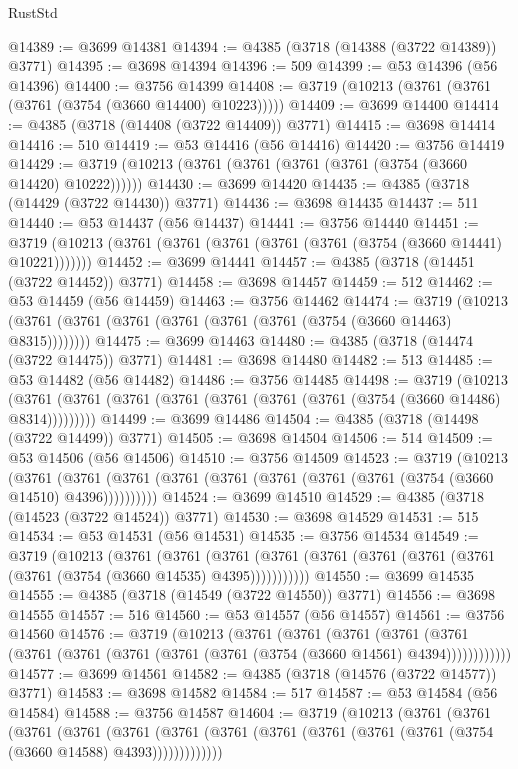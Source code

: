 \begin{lexlean}{RustStd}
\begin{coremodule}
{\begin{coremodule}
{{{{{{{{{{{{{{{{{{{{{{{{{{{{{{{{{{{{{{{{{{{{{{{@14389 := @3699 @14381
@14394 := @4385 (@3718 (@14388 (@3722 @14389)) @3771)
@14395 := @3698 @14394
@14396 := 509
@14399 := @53 @14396 (@56 @14396)
@14400 := @3756 @14399
@14408 := @3719 (@10213 (@3761 (@3761 (@3761 (@3754 (@3660 @14400) @10223)))))
@14409 := @3699 @14400
@14414 := @4385 (@3718 (@14408 (@3722 @14409)) @3771)
@14415 := @3698 @14414
@14416 := 510
@14419 := @53 @14416 (@56 @14416)
@14420 := @3756 @14419
@14429 := @3719 (@10213 (@3761 (@3761 (@3761 (@3761 (@3754 (@3660 @14420) @10222))))))
@14430 := @3699 @14420
@14435 := @4385 (@3718 (@14429 (@3722 @14430)) @3771)
@14436 := @3698 @14435
@14437 := 511
@14440 := @53 @14437 (@56 @14437)
@14441 := @3756 @14440
@14451 := @3719 (@10213 (@3761 (@3761 (@3761 (@3761 (@3761 (@3754 (@3660 @14441) @10221)))))))
@14452 := @3699 @14441
@14457 := @4385 (@3718 (@14451 (@3722 @14452)) @3771)
@14458 := @3698 @14457
@14459 := 512
@14462 := @53 @14459 (@56 @14459)
@14463 := @3756 @14462
@14474 := @3719
    (@10213 (@3761 (@3761 (@3761 (@3761 (@3761 (@3761 (@3754 (@3660 @14463) @8315))))))))
@14475 := @3699 @14463
@14480 := @4385 (@3718 (@14474 (@3722 @14475)) @3771)
@14481 := @3698 @14480
@14482 := 513
@14485 := @53 @14482 (@56 @14482)
@14486 := @3756 @14485
@14498 := @3719
    (@10213 (@3761 (@3761 (@3761 (@3761 (@3761 (@3761 (@3761 (@3754 (@3660 @14486) @8314)))))))))
@14499 := @3699 @14486
@14504 := @4385 (@3718 (@14498 (@3722 @14499)) @3771)
@14505 := @3698 @14504
@14506 := 514
@14509 := @53 @14506 (@56 @14506)
@14510 := @3756 @14509
@14523 := @3719
    (@10213
      (@3761 (@3761 (@3761 (@3761 (@3761 (@3761 (@3761 (@3761 (@3754 (@3660 @14510) @4396))))))))))
@14524 := @3699 @14510
@14529 := @4385 (@3718 (@14523 (@3722 @14524)) @3771)
@14530 := @3698 @14529
@14531 := 515
@14534 := @53 @14531 (@56 @14531)
@14535 := @3756 @14534
@14549 := @3719
    (@10213
      (@3761
        (@3761
          (@3761 (@3761 (@3761 (@3761 (@3761 (@3761 (@3761 (@3754 (@3660 @14535) @4395)))))))))))
@14550 := @3699 @14535
@14555 := @4385 (@3718 (@14549 (@3722 @14550)) @3771)
@14556 := @3698 @14555
@14557 := 516
@14560 := @53 @14557 (@56 @14557)
@14561 := @3756 @14560
@14576 := @3719
    (@10213
      (@3761
        (@3761
          (@3761
            (@3761 (@3761 (@3761 (@3761 (@3761 (@3761 (@3761 (@3754 (@3660 @14561) @4394))))))))))))
@14577 := @3699 @14561
@14582 := @4385 (@3718 (@14576 (@3722 @14577)) @3771)
@14583 := @3698 @14582
@14584 := 517
@14587 := @53 @14584 (@56 @14584)
@14588 := @3756 @14587
@14604 := @3719
    (@10213
      (@3761
        (@3761
          (@3761
            (@3761
              (@3761
                (@3761 (@3761 (@3761 (@3761 (@3761 (@3761 (@3754 (@3660 @14588) @4393)))))))))))))
}}}}}}}}}}}}}}}}}}}}}}}}}}}}}}}}}}}}}}}}}}}}}}}
\end{coremodule}}
\end{coremodule}
\end{lexlean}
